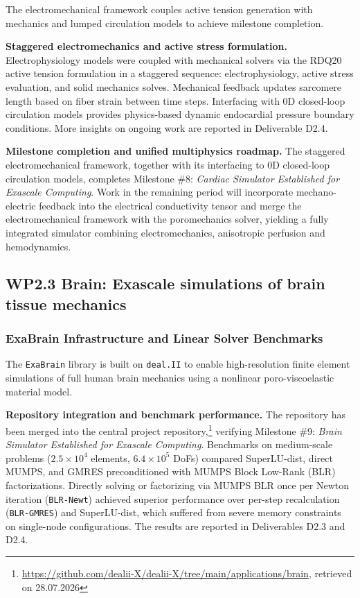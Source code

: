 \documentclass[a4paper,12pt, numbers]{article}
\newcommand{\dealii}{\texttt{deal.II}}
\begin{document}
\noindent The electromechanical framework couples active tension generation with mechanics and lumped circulation models to achieve milestone completion.

\noindent\textbf{Staggered electromechanics and active stress formulation.}
Electrophysiology models were coupled with mechanical solvers via the RDQ20 active tension formulation in a staggered sequence: electrophysiology, active stress evaluation, and solid mechanics solves. Mechanical feedback updates sarcomere length based on fiber strain between time steps. Interfacing with 0D closed-loop circulation models provides physics-based dynamic endocardial pressure boundary conditions. More insights on ongoing work are reported in Deliverable D2.4.

\noindent\textbf{Milestone completion and unified multiphysics roadmap.}
The staggered electromechanical framework, together with its interfacing to 0D closed-loop circulation models, completes Milestone \#8: \emph{Cardiac Simulator Established for Exascale Computing}. Work in the remaining period will incorporate mechano-electric feedback into the electrical conductivity tensor and merge the electromechanical framework with the poromechanics solver, yielding a fully integrated simulator combining electromechanics, anisotropic perfusion and hemodynamics.

\subsection{WP2.3 Brain: Exascale simulations of brain tissue mechanics}

\subsubsection*{ExaBrain Infrastructure and Linear Solver Benchmarks}

\noindent The \texttt{ExaBrain} library is built on \dealii{} to enable high-resolution finite element simulations of full human brain mechanics using a nonlinear poro-viscoelastic material model.

\noindent\textbf{Repository integration and benchmark performance.}
The repository has been merged into the central project repository,\footnote{\url{https://github.com/dealii-X/dealii-X/tree/main/applications/brain}, retrieved on 28.07.2026} verifying Milestone \#9: \emph{Brain Simulator Established for Exascale Computing}. Benchmarks on medium-scale problems ($2.5 \times 10^4$ elements, $6.4 \times 10^5$ DoFs) compared SuperLU-dist, direct MUMPS, and GMRES preconditioned with MUMPS Block Low-Rank (BLR) factorizations. Directly solving or factorizing via MUMPS BLR once per Newton iteration (\texttt{BLR-Newt}) achieved superior performance over per-step recalculation (\texttt{BLR-GMRES}) and SuperLU-dist, which suffered from severe memory constraints on single-node configurations. The results are reported in Deliverables D2.3 and D2.4. 
\end{document}
